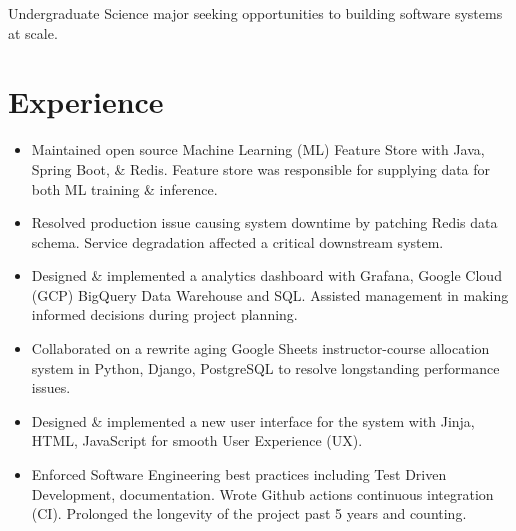 %
%


\fancyhead{} %


Undergraduate Science major seeking opportunities to building software systems at scale.

\section{Experience}
\begin{itemize}
  \item Maintained open source Machine Learning (ML) Feature Store with Java, Spring Boot, \& Redis. Feature store was responsible for supplying data for both ML training \& inference.
  \item Resolved production issue causing system downtime by patching Redis data schema. Service degradation affected a critical downstream system.
  \item
      Designed \& implemented a analytics dashboard with Grafana, Google Cloud (GCP) BigQuery Data Warehouse and SQL. Assisted management in making informed decisions during project planning.
\end{itemize}

\begin{itemize}
  \item Collaborated on a rewrite aging Google Sheets instructor-course allocation system in Python, Django, PostgreSQL to 
    resolve longstanding performance issues. 
  \item Designed \& implemented a new user interface 
    for the system with Jinja, HTML, JavaScript for smooth User Experience (UX).
  \item Enforced Software Engineering best practices including Test Driven Development,
    documentation. Wrote Github actions continuous integration (CI). 
    Prolonged the longevity of the project past 5 years and counting.
\end{itemize}

